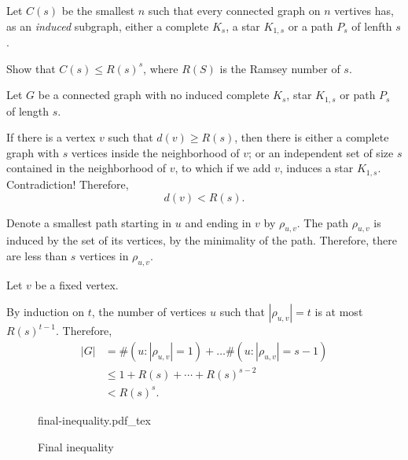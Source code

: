 \documentclass[10pt, a4paper]{article}
\newcommand{\incfig}[2][1]{%
    \def\svgwidth{#1\columnwidth}
    {#2.pdf_tex}
}
\begin{document}
\newpage
\begin{prob}
	Let $C(s)$ be the smallest $n$ such that every connected graph on $n$ vertives has, as an \emph{induced} subgraph, either a complete $K_s$, a star $K_{1, s}$ or a path $P_s$ of lenfth $s$.

	Show that $C(s) \leqslant R(s)^s$, where $R(S)$ is the Ramsey number of $s$.
\end{prob}
\begin{sol}
	Let $G$ be a connected graph with no induced complete $K_s$, star $K_{1, s}$ or path $P_s$ of length $s$.

	If there is a vertex $v$ such that $d(v) \geqslant R(s)$, then there is either a complete graph with $s$ vertices inside the neighborhood of $v$; or an independent set of size $s$ contained in the neighborhood of $v$, to which if we add $v$, induces a star $K_{1, s}$. Contradiction! Therefore, \[
		d(v) < R(s).
	\]

	Denote a smallest path starting in $u$ and ending in $v$ by $\rho_{u, v}$. The path $\rho_{u, v}$ is induced by the set of its vertices, by the minimality of the path. Therefore, there are less than $s$ vertices in $\rho_{u, v}$. 

	Let $v$ be a fixed vertex.

	By induction on $t$, the number of vertices $u$ such that $\left|\rho_{u, v}\right| = t$ is at most $R(s)^{t-1}$. Therefore, \begin{align*}
		|G| &=   \#(u : |\rho_{u, v}| = 1) + \dots \#(u : |\rho_{u, v}| = s-1) \\
			&\leqslant 1 + R(s) + \cdots + R(s)^{s-2} \\
			&< R(s)^s.
	\end{align*}

\end{sol}
\begin{figure}[ht]
    \centering
	\incfig[.7]{final-inequality}
    \caption{Final inequality}
    \label{fig:final-inequality}
\end{figure}
\end{document}
